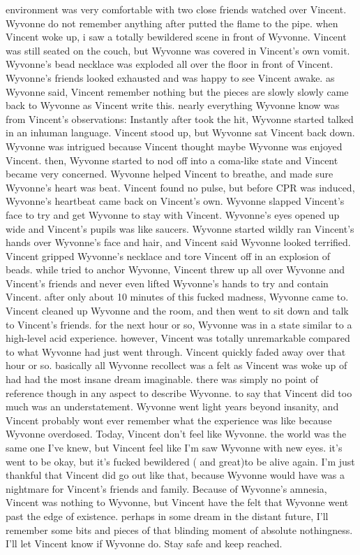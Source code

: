 \documentclass[12pt]{book}
\begin{document}
environment was very comfortable with two close friends watched over Vincent. Wyvonne do not remember anything after putted the flame to the pipe. when Vincent woke up, i saw a totally bewildered scene in front of Wyvonne. Vincent was still seated on the couch, but Wyvonne was covered in Vincent's own vomit. Wyvonne's bead necklace was exploded all over the floor in front of Vincent. Wyvonne's friends looked exhausted and was happy to see Vincent awake. as Wyvonne said, Vincent remember nothing but the pieces are slowly slowly came back to Wyvonne as Vincent write this. nearly everything Wyvonne know was from Vincent's observations: Instantly after took the hit, Wyvonne started talked in an inhuman language. Vincent stood up, but Wyvonne sat Vincent back down. Wyvonne was intrigued because Vincent thought maybe Wyvonne was enjoyed Vincent. then, Wyvonne started to nod off into a coma-like state and Vincent became very concerned. Wyvonne helped Vincent to breathe, and made sure Wyvonne's heart was beat. Vincent found no pulse, but before CPR was induced, Wyvonne's heartbeat came back on Vincent's own. Wyvonne slapped Vincent's face to try and get Wyvonne to stay with Vincent. Wyvonne's eyes opened up wide and Vincent's pupils was like saucers. Wyvonne started wildly ran Vincent's hands over Wyvonne's face and hair, and Vincent said Wyvonne looked terrified. Vincent gripped Wyvonne's necklace and tore Vincent off in an explosion of beads. while tried to anchor Wyvonne, Vincent threw up all over Wyvonne and Vincent's friends and never even lifted Wyvonne's hands to try and contain Vincent. after only about 10 minutes of this fucked madness, Wyvonne came to. Vincent cleaned up Wyvonne and the room, and then went to sit down and talk to Vincent's friends. for the next hour or so, Wyvonne was in a state similar to a high-level acid experience. however, Vincent was totally unremarkable compared to what Wyvonne had just went through. Vincent quickly faded away over that hour or so. basically all Wyvonne recollect was a felt as Vincent was woke up of had had the most insane dream imaginable. there was simply no point of reference though in any aspect to describe Wyvonne. to say that Vincent did too much was an understatement. Wyvonne went light years beyond insanity, and Vincent probably wont ever remember what the experience was like because Wyvonne overdosed. Today, Vincent don't feel like Wyvonne. the world was the same one I've knew, but Vincent feel like I'm saw Wyvonne with new eyes. it's went to be okay, but it's fucked bewildered ( and great)to be alive again. I'm just thankful that Vincent did go out like that, because Wyvonne would have was a nightmare for Vincent's friends and family. Because of Wyvonne's amnesia, Vincent was nothing to Wyvonne, but Vincent have the felt that Wyvonne went past the edge of existence. perhaps in some dream in the distant future, I'll remember some bits and pieces of that blinding moment of absolute nothingness. I'll let Vincent know if Wyvonne do. Stay safe and keep reached.
\end{document}

